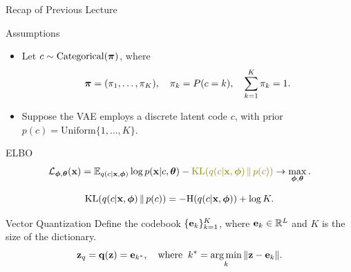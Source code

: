 \documentclass{beamer}
\begin{document}
\begin{frame}
\titlepage
\end{frame}
\begin{frame}{Recap of Previous Lecture}
	\begin{block}{Assumptions}
		\begin{itemize}
			\item Let $c \sim \mathrm{Categorical}(\boldsymbol{\pi})$, where 
			\vspace{-0.6cm}
			\[
			\boldsymbol{\pi} = (\pi_1, \dots, \pi_K), \quad \pi_k = P(c = k), \quad \sum_{k=1}^K \pi_k = 1.
			\]
			\vspace{-0.7cm}
			\item Suppose the VAE employs a discrete latent code $c$, with prior $p(c) = \text{Uniform}\{1, \dots, K\}$.
		\end{itemize}
	\end{block}
	\begin{block}{ELBO}
		\vspace{-0.6cm}
		\[
			\cL_{\bphi, \btheta}(\bx)  = \bbE_{q(c | \bx, \bphi)} \log p(\bx | c, \btheta) - {\color{olive} \KL(q(c| \bx, \bphi) \,\|\, p(c))} \rightarrow \max_{\bphi, \btheta}.
		\]
	\end{block}
	\vspace{-1.0cm}
	\[
		\mathrm{KL}(q(c| \mathbf{x}, \boldsymbol{\phi}) \,\|\, p(c)) = - \mathrm{H}(q(c | \mathbf{x}, \boldsymbol{\phi})) + \log K. 
	\]		
	\vspace{-0.5cm}
	\begin{block}{Vector Quantization}
		Define the codebook $\{\mathbf{e}_k\}_{k=1}^K$, where $\mathbf{e}_k \in \mathbb{R}^L$ and $K$ is the size of the dictionary.
		\vspace{-0.3cm}
		\[
		\mathbf{z}_q = \mathbf{q} (\mathbf{z}) = \mathbf{e}_{k^*}, \quad \text{where}\;\; k^* = \operatorname*{arg\,min}_k \| \mathbf{z} - \mathbf{e}_k \|.
		\] 
		\vspace{-0.7cm}
	\end{block}
\end{frame}
\end{document}
